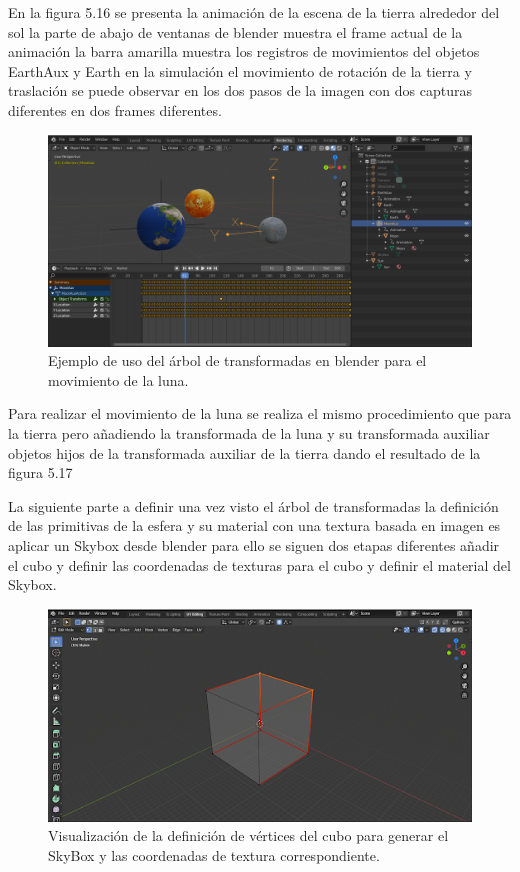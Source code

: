 \documentclass[a4paper, 17pt]{book}
\begin{document}
En la figura 5.16 se presenta la animación de la escena de la tierra alrededor del sol la parte de abajo de ventanas de blender
muestra el frame actual de la animación la barra amarilla muestra los registros de movimientos del objetos EarthAux y Earth en
la simulación el movimiento de rotación de la tierra y traslación se puede observar en los dos pasos de la imagen con dos
capturas diferentes en dos frames diferentes.

\begin{figure}[H]
    \centering
    \includegraphics[scale=0.25, keepaspectratio]{img/MoonAux.png}
    \caption{Ejemplo de uso del árbol de transformadas en blender para el movimiento de la luna.}
    \label{figura:materialesBlender}
\end{figure}

Para realizar el movimiento de la luna se realiza el mismo procedimiento que para la tierra pero añadiendo la transformada de la
luna y su transformada auxiliar objetos hijos de la transformada auxiliar de la tierra dando el resultado de la figura 5.17

\vspace{1mm} %

La siguiente parte a definir una vez visto el árbol de transformadas la definición de las primitivas de la esfera y su material con
una textura basada en imagen es aplicar un Skybox desde blender para ello se siguen dos etapas diferentes añadir el cubo y definir
las coordenadas de texturas para el cubo y definir el material del Skybox.

\begin{figure}[H]
    \centering
    \includegraphics[scale=0.65, keepaspectratio]{img/SkyBoxBlender.png}
    \caption{Visualización de la definición de vértices del cubo para generar el SkyBox y las coordenadas de textura correspondiente.}
    \label{figura:materialesBlender}
\end{figure}
\end{document}
